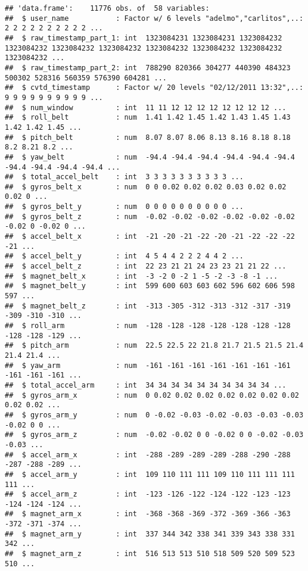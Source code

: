 \documentclass[]{article}
\begin{document}
\begin{verbatim}
## 'data.frame':    11776 obs. of  58 variables:
##  $ user_name           : Factor w/ 6 levels "adelmo","carlitos",..: 2 2 2 2 2 2 2 2 2 2 ...
##  $ raw_timestamp_part_1: int  1323084231 1323084231 1323084232 1323084232 1323084232 1323084232 1323084232 1323084232 1323084232 1323084232 ...
##  $ raw_timestamp_part_2: int  788290 820366 304277 440390 484323 500302 528316 560359 576390 604281 ...
##  $ cvtd_timestamp      : Factor w/ 20 levels "02/12/2011 13:32",..: 9 9 9 9 9 9 9 9 9 9 ...
##  $ num_window          : int  11 11 12 12 12 12 12 12 12 12 ...
##  $ roll_belt           : num  1.41 1.42 1.45 1.42 1.43 1.45 1.43 1.42 1.42 1.45 ...
##  $ pitch_belt          : num  8.07 8.07 8.06 8.13 8.16 8.18 8.18 8.2 8.21 8.2 ...
##  $ yaw_belt            : num  -94.4 -94.4 -94.4 -94.4 -94.4 -94.4 -94.4 -94.4 -94.4 -94.4 ...
##  $ total_accel_belt    : int  3 3 3 3 3 3 3 3 3 3 ...
##  $ gyros_belt_x        : num  0 0 0.02 0.02 0.02 0.03 0.02 0.02 0.02 0 ...
##  $ gyros_belt_y        : num  0 0 0 0 0 0 0 0 0 0 ...
##  $ gyros_belt_z        : num  -0.02 -0.02 -0.02 -0.02 -0.02 -0.02 -0.02 0 -0.02 0 ...
##  $ accel_belt_x        : int  -21 -20 -21 -22 -20 -21 -22 -22 -22 -21 ...
##  $ accel_belt_y        : int  4 5 4 4 2 2 2 4 4 2 ...
##  $ accel_belt_z        : int  22 23 21 21 24 23 23 21 21 22 ...
##  $ magnet_belt_x       : int  -3 -2 0 -2 1 -5 -2 -3 -8 -1 ...
##  $ magnet_belt_y       : int  599 600 603 603 602 596 602 606 598 597 ...
##  $ magnet_belt_z       : int  -313 -305 -312 -313 -312 -317 -319 -309 -310 -310 ...
##  $ roll_arm            : num  -128 -128 -128 -128 -128 -128 -128 -128 -128 -129 ...
##  $ pitch_arm           : num  22.5 22.5 22 21.8 21.7 21.5 21.5 21.4 21.4 21.4 ...
##  $ yaw_arm             : num  -161 -161 -161 -161 -161 -161 -161 -161 -161 -161 ...
##  $ total_accel_arm     : int  34 34 34 34 34 34 34 34 34 34 ...
##  $ gyros_arm_x         : num  0 0.02 0.02 0.02 0.02 0.02 0.02 0.02 0.02 0.02 ...
##  $ gyros_arm_y         : num  0 -0.02 -0.03 -0.02 -0.03 -0.03 -0.03 -0.02 0 0 ...
##  $ gyros_arm_z         : num  -0.02 -0.02 0 0 -0.02 0 0 -0.02 -0.03 -0.03 ...
##  $ accel_arm_x         : int  -288 -289 -289 -289 -288 -290 -288 -287 -288 -289 ...
##  $ accel_arm_y         : int  109 110 111 111 109 110 111 111 111 111 ...
##  $ accel_arm_z         : int  -123 -126 -122 -124 -122 -123 -123 -124 -124 -124 ...
##  $ magnet_arm_x        : int  -368 -368 -369 -372 -369 -366 -363 -372 -371 -374 ...
##  $ magnet_arm_y        : int  337 344 342 338 341 339 343 338 331 342 ...
##  $ magnet_arm_z        : int  516 513 513 510 518 509 520 509 523 510 ...

\end{verbatim}
\end{document}
